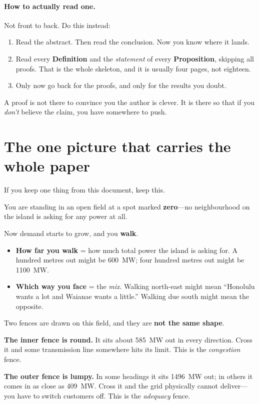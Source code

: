\documentclass[11pt,a4paper]{article}
\begin{document}
\paragraph{How to actually read one.}
Not front to back. Do this instead:

\begin{enumerate}[label=\textbf{\arabic*.}]
\item Read the abstract. Then read the conclusion. Now you know where it lands.
\item Read every \textbf{Definition} and the \emph{statement} of every
      \textbf{Proposition}, skipping all proofs. That is the whole skeleton, and
      it is usually four pages, not eighteen.
\item Only now go back for the proofs, and only for the results you doubt.
\end{enumerate}

A proof is not there to convince you the author is clever. It is there so that
if you \emph{don't} believe the claim, you have somewhere to push.

\section{The one picture that carries the whole paper}\label{sec:picture}

If you keep one thing from this document, keep this.

\begin{anchor}
You are standing in an open field at a spot marked \textbf{zero}---no
neighbourhood on the island is asking for any power at all.

Now demand starts to grow, and you \textbf{walk}.

\begin{itemize}
\item \textbf{How far you walk} = how much total power the island is asking
      for. A hundred metres out might be \SI{600}{\mega\watt}; four hundred
      metres out might be \SI{1100}{\mega\watt}.
\item \textbf{Which way you face} = the \emph{mix}. Walking north-east might
      mean ``Honolulu wants a lot and Waianae wants a little.'' Walking due
      south might mean the opposite.
\end{itemize}

Two fences are drawn on this field, and they are \textbf{not the same shape}.

\medskip
\textbf{The inner fence is round.} It sits about \SI{585}{\mega\watt} out in
every direction. Cross it and some transmission line somewhere hits its limit.
This is the \emph{congestion} fence.

\textbf{The outer fence is lumpy.} In some headings it sits \SI{1496}{\mega\watt}
out; in others it comes in as close as \SI{409}{\mega\watt}. Cross it and the
grid physically cannot deliver---you have to switch customers off. This is the
\emph{adequacy} fence.
\end{anchor}
\end{document}
